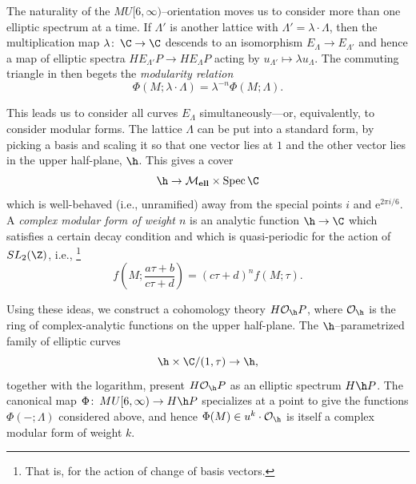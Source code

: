 \begin{example}
The naturality of the \(MU[6, \infty)\)--orientation moves us to consider more than one elliptic spectrum at a time.
If \(\Lambda'\) is another lattice with \(\Lambda' = \lambda \cdot \Lambda\), then the multiplication map \(\lambda\co \C \to \C\) descends to an isomorphism \(E_\Lambda \to E_{\Lambda'}\) and hence a map of elliptic spectra \(HE_{\Lambda'}P \to HE_\Lambda P\) acting by \(u_{\Lambda'} \mapsto \lambda u_\Lambda\).
The commuting triangle in  then begets the \textit{modularity relation} \[\Phi(M; \lambda \cdot \Lambda) = \lambda^{-n} \Phi(M; \Lambda).\]
\end{example}

\begin{example}\label{OrdinaryHomologyInUpperHalfPlaneEx}
This leads us to consider all curves \(E_\Lambda\) simultaneously---or, equivalently, to consider modular forms.
The lattice \(\Lambda\) can be put into a standard form, by picking a basis and scaling it so that one vector lies at \(1\) and the other vector lies in the upper half-plane, \(\h\).
This gives a cover \[\h \to \moduli{ell} \times \Spec \C\] which is well-behaved (i.e., unramified) away from the special points \(i\) and \(\mathrm e^{2 \pi i / 6}\).
A \textit{complex modular form of weight \(n\)} is an analytic function \(\h \to \C\) which satisfies a certain decay condition and which is quasi-periodic for the action of \(SL_2(\Z)\), i.e.,%
\footnote{%
That is, for the action of change of basis vectors.
}
\[f\left(M; \frac{a \tau + b}{c \tau + d} \right) = (c \tau + d)^n f(M; \tau).\]

Using these ideas, we construct a cohomology theory \(H \sheaf O_{\h} P\), where \(\sheaf O_{\h}\) is the ring of complex-analytic functions on the upper half-plane.
The \(\h\)--parametrized family of elliptic curves \[\h \times \C / (1, \tau) \to \h,\] together with the logarithm, present \(H \sheaf O_{\h} P\) as an elliptic spectrum \(H\h P\).
The canonical map \(\Phi\co MU[6, \infty) \to H\h P\) specializes at a point to give the functions \(\Phi(-; \Lambda)\) considered above, and hence \(\Phi(M) \in u^k \cdot \sheaf O_{\h}\) is itself a complex modular form of weight \(k\).
\end{example}

